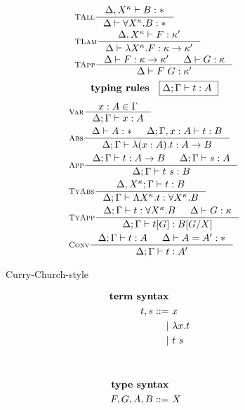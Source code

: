 \begin{figure}
\begin{singlespace}
\begin{minipage}{.46\textwidth}
\begin{align*}
& \inference[\sc TAll]{\Delta,X^\kappa |- B:*}
                      {\Delta |- \forall X^\kappa.B:*} \\
& \inference[\sc TLam]{\Delta,X^\kappa |- F:\kappa'}
                      {\Delta |- \l X^\kappa.F:\kappa -> \kappa'} \\
& \inference[\sc TApp]{\Delta |- F : \kappa -> \kappa' & \Delta |- G : \kappa}
                      {\Delta |- F ~ G : \kappa'} \\
\end{align*}
\[ \textbf{typing rules} \quad \framebox{$ \Delta;\Gamma |- t : A $ } \]
\vspace*{-1em}
\begin{align*}
& \inference[\sc Var]{x:A \in \Gamma}{\Delta;\Gamma |- x:A} \\
& \inference[\sc Abs]{\Delta |- A:* & \Delta;\Gamma,x:A |- t : B}
                     {\Delta;\Gamma |- \l(x:A).t : A -> B} \\
& \inference[\sc App]{\Delta;\Gamma |- t : A -> B & \Delta;\Gamma |- s : A}
                     {\Delta;\Gamma |- t~s : B} \\
& \inference[\sc TyAbs]{\Delta,X^\kappa;\Gamma |- t : B}
                       {\Delta;\Gamma |- \L X^\kappa.t : \forall X^\kappa.B} \\
& \inference[\sc TyApp]{\Delta;\Gamma |- t : \forall X^\kappa.B & \Delta |- G:\kappa}
                       {\Delta;\Gamma |- t[G] : B[G/X]} \\
& \inference[\sc Conv]{\Delta;\Gamma |- t : A & \Delta |- A = A' : *}
                      {\Delta;\Gamma |- t : A'}
\end{align*}
\end{minipage}
\begin{minipage}{.46\textwidth}
        \begin{center}Curry-Church-style\end{center}\vspace*{-1em}
\def\baselinestretch{0}
\small
\begin{align*}
\textbf{term syntax} \\
t,s ::= &~ x           \\
      | &~ \l x    . t \\
      | &~ t ~ s       \\
      \phantom{|} &~ \\
      \phantom{|} &~ \\
\textbf{type syntax} \\
F,G,A,B ::= &~ X                  \\

\end{align*}
\end{minipage}
\end{singlespace}
\end{figure}
